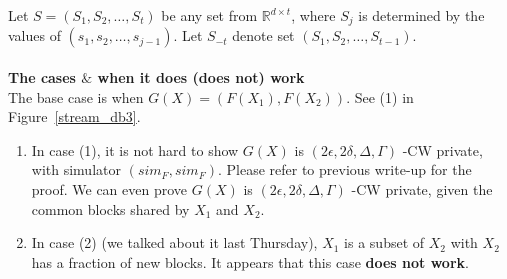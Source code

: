 \documentclass[11pt]{article}
\begin{document}
Let $S=(S_{1}, S_{2}, \dots, S_{t} )$ be any set from $\mathbb {R} ^{d \times t}$, where $S_{j}$ is determined by the values of $(s_{1}, s_{2} , \dots, s_{j-1})$. Let $S_{-t}$ denote set $(S_{1}, S_{2}, \dots, S_{t-1} )$.
\\
\\
{\bf The cases $\&$ when it does (does not) work}\\
The base case is when $G(X) = (F(X_{1}) , F(X_{2}))$. See (1) in Figure~\ref{stream_db3}.
\begin{enumerate}
\item In case (1), it is not hard to show $G(X)$ is $(2 \epsilon, 2 \delta, \Delta, \Gamma)$ -CW private, with simulator $(sim_{F}, sim_{F})$. Please refer to previous write-up for the proof. We can even prove $G(X)$ is $(2 \epsilon, 2 \delta, \Delta, \Gamma)$ -CW private, given the common blocks shared by $X_{1}$ and $X_{2}$.
\item In case (2) (we talked about it last Thursday), $X_{1}$ is a subset of $X_{2}$ with $X_{2}$ has a fraction of new blocks. It appears that this case {\bf does not work}.


\end{enumerate}
\end{document}
